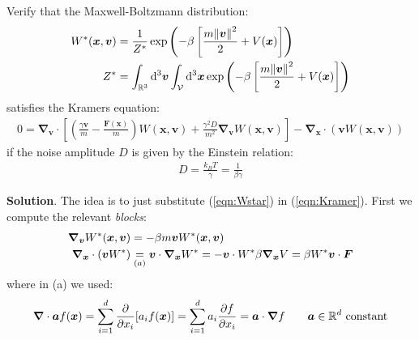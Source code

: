 \documentclass[../template.tex]{subfiles}
\begin{document}
\begin{exo}
    Verify that the Maxwell-Boltzmann distribution:
    \begin{align} \label{eqn:Wstar}
        W^*(\bm{x},\bm{v}) &= \frac{1}{Z^*} \exp\left(-\beta \left[\frac{m \norm{\bm{v}}^2}{2} + V(\bm{x}) \right]\right)\\ Z^* &= \int_{\mathbb{R}^3} \dd[3]{\bm{v}} \int_{\mathcal{V}} \dd[3]{\bm{x}} \exp\left(-\beta \left[\frac{m \norm{\bm{v}}^2}{2} + V(\bm{x}) \right]\right) \nonumber
    \end{align}
    satisfies the Kramers equation:
    \begin{align} \label{eqn:Kramer}
        0 = \bm{\nabla}_{\bm{v}} \cdot \left[\left(\frac{\gamma \bm{v}}{m} - \frac{\bm{F}(\bm{x})}{m}  \right) W(\bm{x},\bm{v}) + \frac{\gamma^2 D}{m^2} \bm{\nabla}_{\bm{v}} W(\bm{x},\bm{v}) \right] - \bm{\nabla}_{\bm{x}} \cdot (\bm{v} W(\bm{x},\bm{v}))
    \end{align}
    if the noise amplitude $D$ is given by the Einstein relation:
    \begin{align*}
        D = \frac{k_B T}{\gamma} = \frac{1}{\beta \gamma} 
    \end{align*}

    \medskip

    \textbf{Solution}. The idea is to just substitute (\ref{eqn:Wstar}) in (\ref{eqn:Kramer}). First we compute the relevant \textit{blocks}: 
    \begin{align*}
        \grad_{\bm{v}} W^*(\bm{x},\bm{v}) &= - \beta m \bm{v} W^*(\bm{x},\bm{v})\\
        \grad_{\bm{x}} \cdot (\bm{v} W^*) &\underset{(a)}{=}  \bm{v} \cdot \grad_{\bm{x}} W^* = -\bm{v} \cdot W^* \beta \grad_{\bm{x}} V = \beta W^* \bm{v} \cdot \bm{F}
    \end{align*}
    where in (a) we used:
\begin{align*}
    \grad \cdot \bm{a} f(\bm{x}) = \sum_{i=1}^d \pdv{x_i} [a_i f(\bm{x})] = \sum_{i=1}^d a_i \pdv{f}{x_i} (\bm{x}) = \bm{a} \cdot \grad f \qquad \bm{a} \in \mathbb{R}^d \text{ constant}
\end{align*}


\end{exo}
\end{document}
